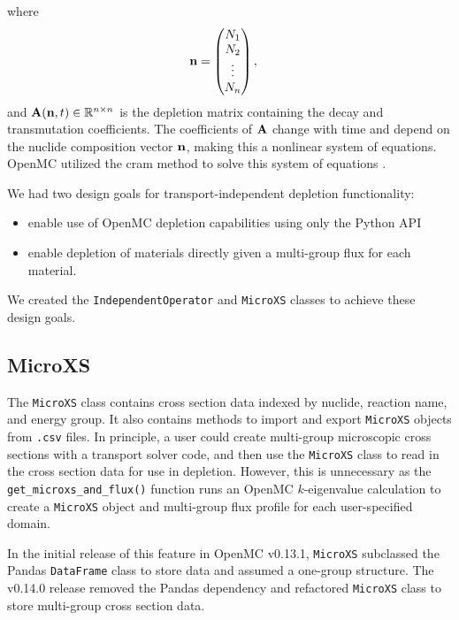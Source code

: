     where
    \begin{equation}
      \mathbf{n} = \begin{pmatrix} N_1 \\ N_2 \\ \vdots \\ N_n \end{pmatrix}, \quad
    \end{equation}
    and $\mathbf{A}(\mathbf{n},t) \in \mathbb{R}^{n\times n}$ is the depletion
    matrix containing the decay and transmutation coefficients. The coefficients
    of $\mathbf{A}$ change with time and depend on the nuclide
    composition vector $\mathbf{n}$, making this a nonlinear system of equations.
    OpenMC utilized the \Gls{cram} method to solve this system of equations
    \citep{romano_depletion_2021}. 
    
    We had two design goals for
    transport-independent depletion functionality:
    \begin{itemize}
        \item enable use of OpenMC depletion capabilities using only the Python API
        \item enable depletion of materials directly given a multi-group flux
            for each material.
    \end{itemize}
    We created the \verb.IndependentOperator. and \verb.MicroXS. classes to
    achieve these design goals.    
    \subsection{MicroXS}
        \label{sub:microxs}
        The \verb.MicroXS. class contains cross section data indexed by nuclide,
        reaction name, and energy group. It also contains methods to import and
        export \verb.MicroXS. objects from \verb,.csv, files. In principle, a
        user could create multi-group microscopic cross sections with a
        transport solver code, and then use the \verb.MicroXS.  class to read in
        the cross section data for use in depletion. However, this is
        unnecessary as the \verb.get_microxs_and_flux(). function runs an OpenMC
        $k$-eigenvalue calculation to create a \verb.MicroXS. object and
        multi-group flux profile for each user-specified domain.

        In the initial release of this feature in OpenMC v0.13.1, \verb.MicroXS.
        subclassed the Pandas \verb.DataFrame. class to store data and assumed a
        one-group structure. The v0.14.0 release removed the Pandas dependency
        and refactored \verb.MicroXS. class to store multi-group cross section
        data.

